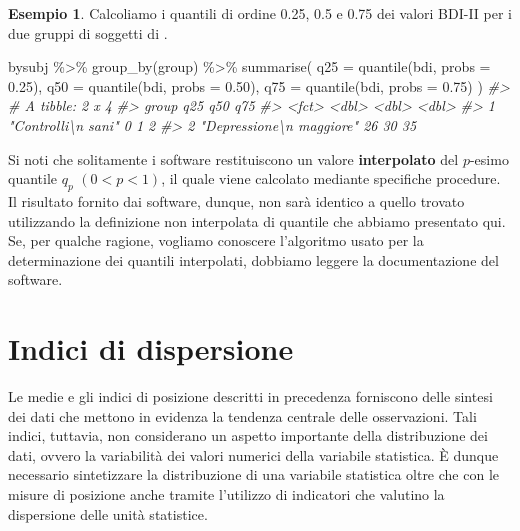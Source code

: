 \documentclass[
  10pt,
  italian,
  a4paper,
  extrafontsizes,onecolumn,openright
  ]{memoir}
\newenvironment{Shaded}{\begin{snugshade}}{\end{snugshade}}
\newcommand{\AttributeTok}[1]{\textcolor[rgb]{0.77,0.63,0.00}{#1}}
\newcommand{\CommentTok}[1]{\textcolor[rgb]{0.56,0.35,0.01}{\textit{#1}}}
\newcommand{\FloatTok}[1]{\textcolor[rgb]{0.00,0.00,0.81}{#1}}
\newcommand{\FunctionTok}[1]{\textcolor[rgb]{0.00,0.00,0.00}{#1}}
\newcommand{\NormalTok}[1]{#1}
\newcommand{\SpecialCharTok}[1]{\textcolor[rgb]{0.00,0.00,0.00}{#1}}
\theoremstyle{definition}
\theoremstyle{definition}
\newtheorem{example}{Esempio}[chapter]
\theoremstyle{definition}
\theoremstyle{definition}
\theoremstyle{remark}
\begin{document}
\begin{example}

Calcoliamo i quantili di ordine 0.25, 0.5 e 0.75 dei valori BDI-II per i due gruppi di soggetti di \textcite{zetschefuture2019}.

\begin{Shaded}
\begin{Highlighting}[]
\NormalTok{bysubj }\SpecialCharTok{\%\textgreater{}\%}
  \FunctionTok{group\_by}\NormalTok{(group) }\SpecialCharTok{\%\textgreater{}\%}
  \FunctionTok{summarise}\NormalTok{(}
    \AttributeTok{q25 =} \FunctionTok{quantile}\NormalTok{(bdi, }\AttributeTok{probs =} \FloatTok{0.25}\NormalTok{),}
    \AttributeTok{q50 =} \FunctionTok{quantile}\NormalTok{(bdi, }\AttributeTok{probs =} \FloatTok{0.50}\NormalTok{),}
    \AttributeTok{q75 =} \FunctionTok{quantile}\NormalTok{(bdi, }\AttributeTok{probs =} \FloatTok{0.75}\NormalTok{)}
\NormalTok{  )}
\CommentTok{\#\textgreater{} \# A tibble: 2 x 4}
\CommentTok{\#\textgreater{}   group                      q25   q50   q75}
\CommentTok{\#\textgreater{}   \textless{}fct\textgreater{}                    \textless{}dbl\textgreater{} \textless{}dbl\textgreater{} \textless{}dbl\textgreater{}}
\CommentTok{\#\textgreater{} 1 "Controlli\textbackslash{}n sani"           0     1     2}
\CommentTok{\#\textgreater{} 2 "Depressione\textbackslash{}n maggiore"    26    30    35}
\end{Highlighting}
\end{Shaded}

\end{example}

Si noti che solitamente i software restituiscono un valore \textbf{interpolato} del \(p\)-esimo quantile \(q_p\) \((0 < p < 1)\), il quale viene calcolato mediante specifiche procedure. Il risultato fornito dai software, dunque, non sarà identico a quello trovato utilizzando la definizione non interpolata di quantile che abbiamo presentato qui. Se, per qualche ragione, vogliamo conoscere l'algoritmo usato per la determinazione dei quantili interpolati, dobbiamo leggere la documentazione del software.

\hypertarget{indici-di-dispersione}{%
\section{Indici di dispersione}\label{indici-di-dispersione}}

Le medie e gli indici di posizione descritti in precedenza forniscono
delle sintesi dei dati che mettono in evidenza la tendenza centrale
delle osservazioni. Tali indici, tuttavia, non considerano un aspetto
importante della distribuzione dei dati, ovvero la variabilità dei
valori numerici della variabile statistica. È dunque necessario
sintetizzare la distribuzione di una variabile statistica oltre che con
le misure di posizione anche tramite l'utilizzo di indicatori che
valutino la dispersione delle unità statistice.
\end{document}
